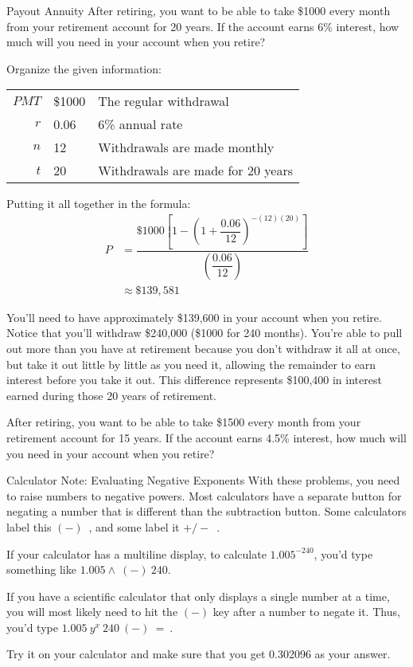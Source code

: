 \begin{example}[https://www.youtube.com/watch?v=A2pKYPSXUbw]{Payout Annuity}
After retiring, you want to be able to take \$1000 every month from your retirement account for 20 years.  If the account earns 6\% interest, how much will you need in your account when you retire?

\sol
Organize the given information:
\begin{center}
\begin{tabular}{r l l}
$PMT$ & \$1000 & The regular withdrawal\\
$r$ & 0.06 & 6\% annual rate\\
$n$ & 12 & Withdrawals are made monthly\\
$t$ & 20 & Withdrawals are made for 20 years
\end{tabular}
\end{center}

Putting it all together in the formula:
\begin{align*}
P &= \dfrac{\$1000\left[1-\left(1+\dfrac{0.06}{12}\right)^{-(12)(20)}\right]}{\left(\dfrac{0.06}{12}\right)}\\
&\approx \boxed{\$139,581}
\end{align*}

You'll need to have approximately \$139,600 in your account when you retire.  Notice that you'll withdraw \$240,000 (\$1000 for 240 months).  You're able to pull out more than you have at retirement because you don't withdraw it all at once, but take it out little by little as you need it, allowing the remainder to earn interest before you take it out.  This difference represents \$100,400 in interest earned during those 20 years of retirement.
\end{example}

\begin{try}
After retiring, you want to be able to take \$1500 every month from your retirement account for 15 years.  If the account earns 4.5\% interest, how much will you need in your account when you retire?
\end{try}

\begin{proc}{Calculator Note: Evaluating Negative Exponents}
With these problems, you need to raise numbers to negative powers.  Most calculators have a separate button for negating a number that is different than the subtraction button.  Some calculators label this $\boxed{(-)}$\ , and some label it $\boxed{+/-}$\ .

If your calculator has a multiline display, to calculate $1.005^{-240}$, you'd type something like $1.005 \boxed{\wedge}\ \boxed{(-)}\ 240$.

If you have a scientific calculator that only displays a single number at a time, you will most likely need to hit the $\boxed{(-)}$ key after a number to negate it.  Thus, you'd type $1.005\ \boxed{y^x}\ 240\ \boxed{(-)}\ \boxed{=}\ $.

Try it on your calculator and make sure that you get 0.302096 as your answer.
\end{proc}

